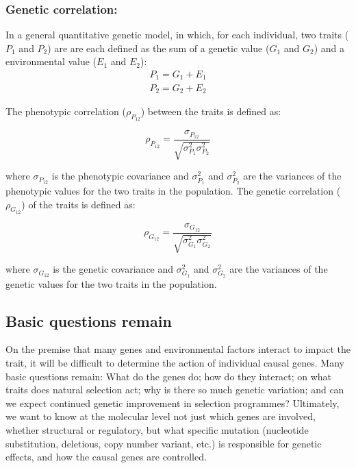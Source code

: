 \documentclass[
]{book}
\begin{document}
\hypertarget{genetic-correlation}{%
\subsubsection{Genetic correlation:}\label{genetic-correlation}}

In a general quantitative genetic model, in which, for each individual, two traits (\(P_1\) and \(P_2\)) are are each defined as the sum of a genetic value (\(G_1\) and \(G_2\)) and a environmental value (\(E_1\) and \(E_2\)):
\begin{align}
P_1 = G_1 + E_1 \\
P_2 = G_2 + E_2
\end{align}

The phenotypic correlation (\(\rho_{P_{12}}\)) between the traits is defined as:

\[\rho_{P_{12}}=\frac{\sigma_{P_{12}}}{\sqrt{\sigma_{P_{1}}^2 \sigma_{P_{2}}^2}}\]

where \(\sigma_{P_{12}}\) is the phenotypic covariance and \(\sigma_{P_{1}}^2\) and \(\sigma_{P_{2}}^2\) are the variances of the phenotypic values for the two traits in the population.
The genetic correlation (\(\rho_{G_{12}}\)) of the traits is defined as:

\[\rho_{G_{12}}=\frac{\sigma_{G_{12}}}{\sqrt{\sigma_{G_{1}}^2 \sigma_{G_{2}}^2}}\]

where \(\sigma_{G_{12}}\) is the genetic covariance and \(\sigma_{G_{1}}^2\) and \(\sigma_{G_{2}}^2\) are the variances of the genetic values for the two traits in the population.

\hypertarget{basic-questions-remain}{%
\subsection{Basic questions remain}\label{basic-questions-remain}}

On the premise that many genes and environmental factors interact to impact the trait, it will be difficult to determine the action of individual causal genes. Many basic questions remain: What do the genes do; how do they interact; on what traits does natural selection act; why is there so much genetic variation; and can we expect continued genetic improvement in selection programmes? Ultimately, we want to know at the molecular level not just which genes are involved, whether structural or regulatory, but what specific mutation (nucleotide substitution, deletious, copy number variant, etc.) is responsible for genetic effects, and how the causal genes are controlled.
\end{document}

